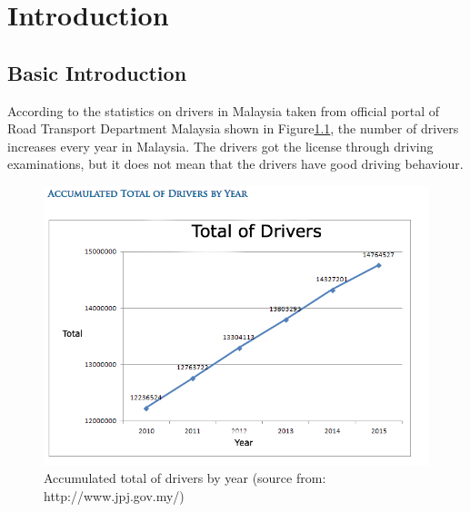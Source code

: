 \chapter{Introduction}
\section{Basic Introduction}

According to the statistics on drivers in Malaysia taken from official portal of Road Transport Department Malaysia shown in Figure\ref{fig:driver}, the number of drivers increases every year in Malaysia. The drivers got the license through driving examinations, but it does not mean that the drivers have good driving behaviour.
 
\begin{figure}[hbt!]\centering
\includegraphics[width=.75\textwidth]{image/totaldriver}
\caption{Accumulated total of drivers by year (source from: http://www.jpj.gov.my/) }
\label{fig:driver}
\end{figure}

